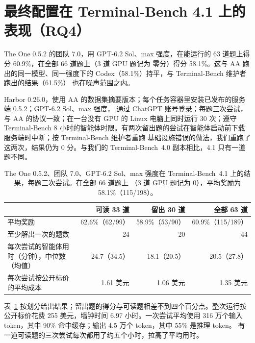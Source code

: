 \section{最终配置在 Terminal-Bench 4.1 上的表现（RQ4）}
\label{sec:tb41}

The One 0.5.2 的团队 7.0，用 GPT-6.2 Sol、max 强度，在能运行的 63 道题上得分 60.9\%，在全部 66 道题上（3 道 GPU 题记为
零分）得分 58.1\%。这与 AA 跑出的同一模型、同一强度下的 Codex（58.1\%）持平，与 Terminal-Bench 维护者跑出的结果（61.5\%）
也在噪声范围之内。

Harbor 0.26.0，使用 AA 的数据集摘要版本；每个任务容器里安装已发布的服务端 0.5.2；GPT-6.2 Sol、max 强度，
通过 ChatGPT 账号登录；每题三次尝试，与 AA 的协议一致；在一台没有 GPU 的 Linux 电脑上同时运行 30 次；遵守
Terminal-Bench 8 小时的智能体时限。有两次留出题的尝试在智能体启动前下载服务端时中断；按 Terminal-Bench 维护者重跑
基础设施错误的做法，我们重跑了这两次，结果仍为 0 分。与我们的 Terminal-Bench~4.0 副本相比，4.1 只有一道题不同。

\begin{table}[t]
\centering
\small
\caption{The One 0.5.2、团队 7.0、GPT-6.2 Sol、max 强度在 Terminal-Bench~4.1 上的结果，每题三次尝试。在全部 66 道题上
（3 道 GPU 题记为 0），平均奖励为 58.1\%（115/198）。}
\label{tab:tb41}
\begin{tabular}{@{}lrrr@{}}
\toprule
 & 可读 33 道 & 留出 30 道 & 全部 63 道 \\
\midrule
平均奖励 & 62.6\%（62/99） & 58.9\%（53/90） & 60.9\%（115/189） \\
至少解出一次的题数 & 24 & 20 & 44 \\
每次尝试的智能体用时（分钟），中位数（均值） & 24.7（34.5） & 18.1（20.5） & 20.5（27.8） \\
每次尝试按公开标价的平均成本 & 1.61 美元 & 1.06 美元 & 1.35 美元 \\
\bottomrule
\end{tabular}
\end{table}

表~\ref{tab:tb41} 按划分给出结果；留出题的得分与可读题相差不到四个百分点。整次运行按公开标价花费 255 美元，墙钟时间
6.97 小时。一次尝试平均使用 316 万个输入 token，其中 90\% 命中缓存；输出 4.5 万个 token，其中 55\% 是推理 token。
有一道可读题的三次尝试每次都用了约五个小时，拉高了平均用时。

